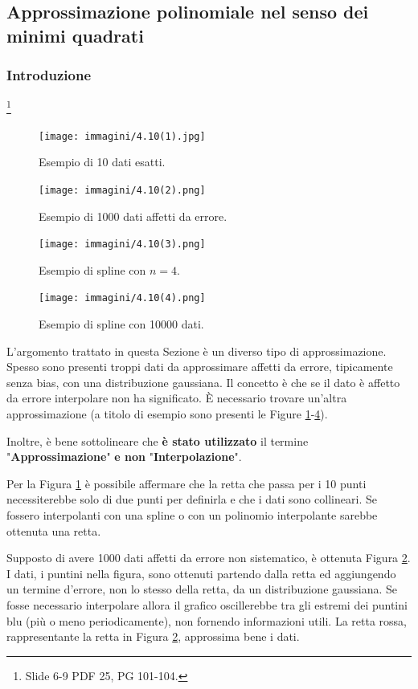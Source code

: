 \subsection{Approssimazione polinomiale nel senso dei minimi quadrati}\label{ssec:approssimazione_polinomiale_minimi_quadrati}
\subsubsection{Introduzione}
\footnote{Slide 6-9 PDF 25, PG 101-104.}

\begin{figure}
	\centering
	\texttt{[image: immagini/4.10(1).jpg]}
	\caption{Esempio di 10 dati esatti.}
	\label{fig:4.10(1)}
\end{figure}

\begin{figure}
	\centering
	\texttt{[image: immagini/4.10(2).png]}
	\caption{Esempio di 1000 dati affetti da errore.}\label{fig:4.10(2)}
\end{figure}

\begin{figure}
	\centering
	\texttt{[image: immagini/4.10(3).png]}
	\caption{Esempio di spline con $n=4$.}\label{fig:4.10(3)}
\end{figure}

\begin{figure}
	\centering
	\texttt{[image: immagini/4.10(4).png]}
	\caption{Esempio di spline con 10000 dati.}\label{fig:4.10(4)}
\end{figure}

L'argomento trattato in questa Sezione è un diverso tipo di approssimazione. Spesso sono presenti troppi dati da approssimare affetti da errore, tipicamente senza bias, con una distribuzione gaussiana. Il concetto è che se il dato è affetto da errore interpolare non ha significato. È necessario trovare un'altra approssimazione (a titolo di esempio sono presenti le Figure \ref{fig:4.10(1)}-\ref{fig:4.10(4)}).

Inoltre, è bene sottolineare che \textbf{è stato utilizzato} il termine "\textbf{Approssimazione}" \textbf{e non} "\textbf{Interpolazione}".

Per la Figura \ref{fig:4.10(1)} è possibile affermare che la retta che passa per i 10 punti necessiterebbe solo di due punti per definirla e che i dati sono \gls{collineari}. Se fossero interpolanti con una spline o con un polinomio interpolante sarebbe ottenuta una retta.

Supposto di avere 1000 dati affetti da errore non sistematico, è ottenuta Figura \ref{fig:4.10(2)}. I dati, i puntini nella figura, sono ottenuti partendo dalla retta ed aggiungendo un termine d'errore, non lo stesso della retta, da un distribuzione gaussiana. Se fosse necessario interpolare allora il grafico oscillerebbe tra gli estremi dei puntini blu (più o meno periodicamente), non fornendo informazioni utili. La retta rossa, rappresentante la retta in Figura \ref{fig:4.10(2)}, approssima bene i dati.

